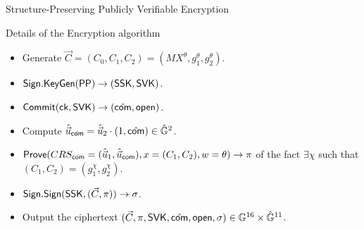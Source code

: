 \begin{frame}{Structure-Preserving Publicly Verifiable Encryption}
  \begin{block}{Details of the Encryption algorithm}
   
    \begin{itemize}
    \item Generate $\vec{C} = (C_0, C_1, C_2) = (MX^{\theta}, g_1^{\theta},  g_2^{\theta})$.
    \item ${\mathsf{Sign}}.{\mathsf{KeyGen}}(\mathsf{PP}) \to (\mathsf{SSK}, \mathsf{SVK})$.
    \item ${\mathsf{Commit}}(\mathsf{ck}, \mathsf{SVK}) \to (\hat{\mathsf{com}}, \mathsf{open})$.
    \item Compute $\hat{\vec{u}}_{\hat{\mathsf{com}}} = \hat{\vec{u}}_2 \cdot (1, \hat{\mathsf{com}}) \in \hat{\mathbb{G}}^2$.
    \item ${\mathsf{Prove}}(CRS_{\hat{\mathsf{com}}} = (\hat{\vec{u}}_1, \hat{\vec{u}}_{\mathsf{com}}), x = (C_1, C_2), w = \theta) \to \pi$ of the fact $\exists \chi$ such that $(C_1, C_2) = (g_1^\chi, g_2^\chi)$.
    \item ${\mathsf{Sign}}.{\mathsf{Sign}}(\mathsf{SSK},(\vec{C},\pi)) \to \sigma$.
    \item Output the ciphertext $(\vec{C}, \pi, \mathsf{SVK}, \hat{\mathsf{com}}, \mathsf{open}, \sigma) \in \mathbb{G}^{16} \times \hat{\mathbb{G}}^{11}$.
    \end{itemize}

  \end{block}
\end{frame}


